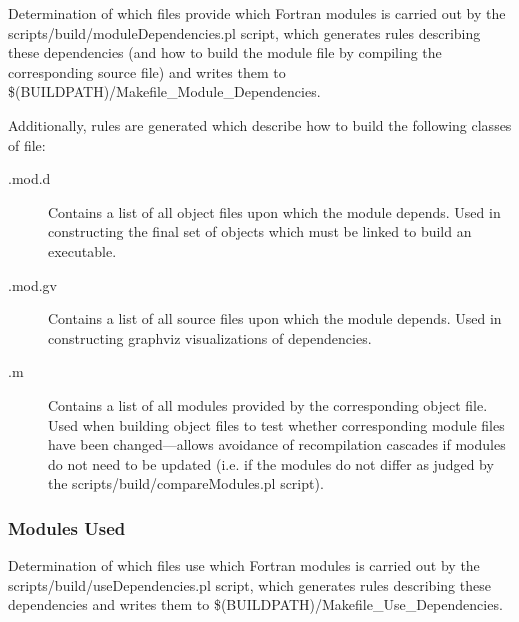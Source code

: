 Determination of which files provide which Fortran modules is carried out by the {\normalfont \ttfamily scripts/build/moduleDependencies.pl} script, which generates rules describing these dependencies (and how to build the module file by compiling the corresponding source file) and writes them to {\normalfont \ttfamily \$(BUILDPATH)/Makefile\_Module\_Dependencies}.

Additionally, rules are generated which describe how to build the following classes of file:
\begin{description}
\item[{\normalfont \ttfamily *.mod.d}] Contains a list of all object files upon which the module depends. Used in constructing the final set of objects which must be linked to build an executable.
\item[{\normalfont \ttfamily *.mod.gv}] Contains a list of all source files upon which the module depends. Used in constructing \gls{graphviz} visualizations of dependencies.
\item[{\normalfont \ttfamily *.m}] Contains a list of all modules provided by the corresponding object file. Used when building object files to test whether corresponding module files have been changed---allows avoidance of recompilation cascades if modules do not need to be updated (i.e. if the modules do not differ as judged by the {\normalfont \ttfamily scripts/build/compareModules.pl} script).
\end{description}

\subsubsection{Modules Used}\label{sec:buildModulesUsed}

Determination of which files use which Fortran modules is carried out by the {\normalfont \ttfamily scripts/build/useDependencies.pl} script, which generates rules describing these dependencies and writes them to {\normalfont \ttfamily \$(BUILDPATH)/Makefile\_Use\_Dependencies}.

